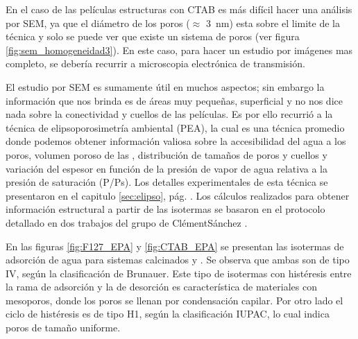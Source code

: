 		En el caso de las películas estructuras con CTAB es más difícil hacer una análisis por SEM, ya que el diámetro de los poros ($\approx$ \SI{3}{\nm}) esta sobre el limite de la técnica y solo se puede ver que existe un sistema de poros (ver figura \ref{fig:sem_homogeneidad3}). En este caso, para hacer un estudio por imágenes mas completo, se debería recurrir a microscopia electrónica de transmisión.

		El estudio por SEM es sumamente útil en muchos aspectos; sin embargo la información que nos brinda es de áreas muy pequeñas, superficial y no nos dice nada sobre la conectividad y cuellos de las películas.  Es por ello recurrió a la técnica de elipsoporosimetría ambiental (PEA), la cual es una técnica promedio donde podemos obtener información valiosa sobre la accesibilidad del agua a los poros, volumen poroso de las \pdm, distribución de tamaños de poros y cuellos y variación del espesor en función de la presión de vapor de agua relativa a la presión de saturación (P/Ps). Los detalles experimentales de esta técnica se presentaron en el capitulo \ref{sec:elipso}, pág. \pageref{sec:elipso}. Los cálculos realizados para obtener información estructural a partir de las isotermas se basaron en el protocolo detallado en dos trabajos del grupo de ClémentSánchez \cite{Boissiere2005,Sakatani2006}.

		En las figuras \ref{fig:F127_EPA} y \ref{fig:CTAB_EPA} se presentan las isotermas de adsorción de agua para sistemas calcinados \pdmF\space y \pdmC. Se observa que ambas son de tipo IV, según la clasificación de Brunauer\cite{Gregg1967,Violi2015,Fuertes2010}. Este tipo de isotermas con histéresis entre la rama de adsorción y la de desorción es característica de materiales con mesoporos, donde los poros se llenan por condensación capilar. Por otro lado el ciclo de histéresis es de tipo H1, según la clasificación IUPAC\cite{Gregg1967,Lowell2004,Sing1985a}, lo cual indica poros de tamaño uniforme.


